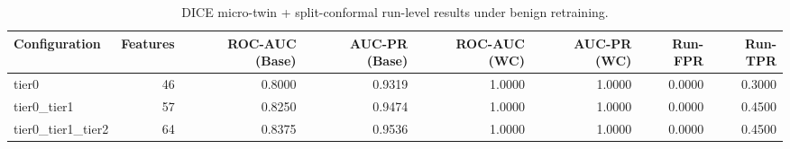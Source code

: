 \begin{table}[t]
\centering
\caption{DICE micro-twin + split-conformal run-level results under benign retraining.}
\label{tab:dice_full_overall}
\footnotesize
\begin{tabular}{lrrrrrrr}
\toprule
Configuration & Features & ROC-AUC (Base) & AUC-PR (Base) & ROC-AUC (WC) & AUC-PR (WC) & Run-FPR & Run-TPR \\
\midrule
tier0 & 46 & 0.8000 & 0.9319 & 1.0000 & 1.0000 & 0.0000 & 0.3000 \\
tier0_tier1 & 57 & 0.8250 & 0.9474 & 1.0000 & 1.0000 & 0.0000 & 0.4500 \\
tier0_tier1_tier2 & 64 & 0.8375 & 0.9536 & 1.0000 & 1.0000 & 0.0000 & 0.4500 \\
\bottomrule
\end{tabular}

\end{table}
